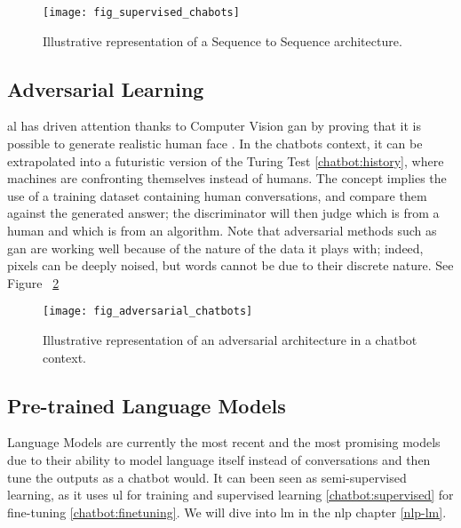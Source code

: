 \begin{figure}[H]
    \centering
    \texttt{[image: fig\_supervised\_chabots]}
    \caption{Illustrative representation of a Sequence to Sequence architecture.}
    \label{fig:fig_supervised_chabots}
\end{figure}

\subsection{Adversarial Learning}
\label{chatbot:adversarial}
\gls{al} has driven attention thanks to Computer Vision \gls{gan} \autocite{paper:Karras2019stylegan2} by proving that it is possible to generate realistic human face \autocite{website:person_does_not_exist}. In the chatbots context, it can be extrapolated into a futuristic version of the Turing Test \ref{chatbot:history}, where machines are confronting themselves instead of humans. The concept implies the use of a training dataset containing human conversations, and compare them against the generated answer; the discriminator will then judge which is from a human and which is from an algorithm. Note that adversarial methods such as \gls{gan} are working well because of the nature of the data it plays with; indeed, pixels can be deeply noised, but words cannot be due to their discrete nature. See Figure ~\ref{fig:fig_adversarial_chatbots} 

\begin{figure}[H]
    \centering
    \texttt{[image: fig\_adversarial\_chatbots]}
    \caption{Illustrative representation of an adversarial architecture in a chatbot context.}
    \label{fig:fig_adversarial_chatbots}
\end{figure}

\subsection{Pre-trained Language Models}
Language Models are currently the most recent and the most promising models due to their ability to model language itself instead of conversations and then tune the outputs as a chatbot would. It can been seen as semi-supervised learning, as it uses \gls{ul} for training and supervised learning \ref{chatbot:supervised} for fine-tuning \ref{chatbot:finetuning}. We will dive into \gls{lm} in the \gls{nlp} chapter \ref{nlp-lm}.

